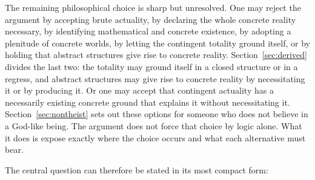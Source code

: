 \documentclass[11pt,letterpaper]{article}
\theoremstyle{plain}
\theoremstyle{definition}
\begin{document}
The remaining philosophical choice is sharp but unresolved. One may reject the argument by accepting brute actuality, by declaring the whole concrete reality necessary, by identifying mathematical and concrete existence, by adopting a plenitude of concrete worlds, by letting the contingent totality ground itself, or by holding that abstract structures give rise to concrete reality. Section~\ref{sec:derived} divides the last two: the totality may ground itself in a closed structure or in a regress, and abstract structures may give rise to concrete reality by necessitating it or by producing it. Or one may accept that contingent actuality has a necessarily existing concrete ground that explains it without necessitating it. Section~\ref{sec:nontheist} sets out these options for someone who does not believe in a God-like being. The argument does not force that choice by logic alone. What it does is expose exactly where the choice occurs and what each alternative must bear.

The central question can therefore be stated in its most compact form:
\begin{center}
\end{center}
\end{document}
